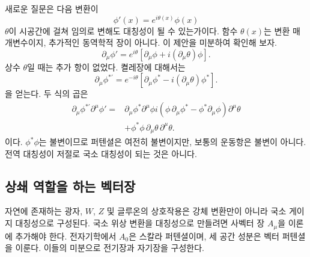 새로운 질문은 다음 변환이
\begin{equation}
  \phi'(x)=e^{i\theta(x)}\phi(x)
  \label{eq:l07-local-u1}
\end{equation}
\(\theta\)이 시공간에 걸쳐 임의로 변해도 대칭성이 될 수 있는가이다. 함수 \(\theta(x)\)는 변환 매개변수이지, 추가적인 동역학적 장이 아니다. 이 제안을 미분하여 확인해 보자.
\begin{equation}
  \partial_\mu\phi'
  =e^{i\theta}
   \left[\partial_\mu\phi+i(\partial_\mu\theta)\phi\right].
  \label{eq:l07-local-derivative}
\end{equation}
상수 \(\theta\)일 때는 추가 항이 없었다. 켤레장에 대해서는
\begin{equation}
  \partial_\mu\phi^{*\prime}
  =e^{-i\theta}
   \left[\partial_\mu\phi^*-i(\partial_\mu\theta)\phi^*\right].
\end{equation}
을 얻는다. 두 식의 곱은
\begin{align}
  \partial_\mu\phi^{*\prime}\partial^\mu\phi'
  ={}&
  \partial_\mu\phi^*\partial^\mu\phi
  i\left(
      \phi\,\partial_\mu\phi^*
      -\phi^*\partial_\mu\phi
    \right)\partial^\mu\theta
  \nonumber\\
  &+\phi^*\phi\,
    \partial_\mu\theta\,\partial^\mu\theta.
  \label{eq:l07-local-failure}
\end{align}
이다. \(\phi^*\phi\)는 불변이므로 퍼텐셜은 여전히 불변이지만, 보통의 운동항은 불변이 아니다. 전역 대칭성이 저절로 국소 대칭성이 되는 것은 아니다.

\begin{classroomqa}
\end{classroomqa}

\subsection{상쇄 역할을 하는 벡터장}

자연에 존재하는 광자, \(W\), \(Z\) 및 글루온의 상호작용은 강체 변환만이 아니라 국소 게이지 대칭성으로 구성된다. 국소 위상 변환을 대칭성으로 만들려면 사벡터 장 \(A_\mu\)을 이론에 추가해야 한다. 전자기학에서 \(A_0\)은 스칼라 퍼텐셜이며, 세 공간 성분은 벡터 퍼텐셜을 이룬다. 이들의 미분으로 전기장과 자기장을 구성한다.


